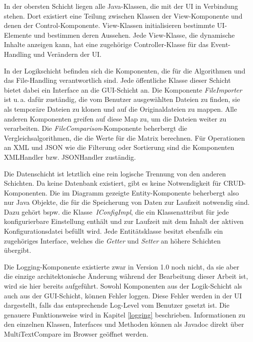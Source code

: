 In der obersten Schicht liegen alle Java-Klassen, die mit der UI in Verbindung stehen. Dort existiert eine Teilung zwischen Klassen der View-Komponente und denen der Control-Komponente. View-Klassen initialisieren bestimmte UI-Elemente und bestimmen deren Aussehen. Jede View-Klasse, die dynamische Inhalte anzeigen kann, hat eine zugehörige Controller-Klasse für das Event-Handling und Verändern der UI. 

In der Logikschicht befinden sich die Komponenten, die für die Algorithmen und das File-Handling verantwortlich sind. Jede öffentliche Klasse dieser Schicht bietet dabei ein Interface an die GUI-Schicht an. Die Komponente \textit{FileImporter} ist u.\,a. dafür zuständig, die vom Benutzer ausgewählten Dateien zu finden, sie als temporäre Dateien zu klonen und auf die Originaldateien zu mappen. Alle anderen Komponenten greifen auf diese Map zu, um die Dateien weiter zu verarbeiten. Die \emph{FileComparison}-Komponente beherbergt die Vergleichsalgorithmen, die die Werte für die Matrix berechnen. Für Operationen an XML und JSON wie die Filterung oder Sortierung sind die Komponenten XMLHandler bzw. JSONHandler zuständig.

Die Datenschicht ist letztlich eine rein logische Trennung von den anderen Schichten. Da keine Datenbank existiert, gibt es keine Notwendigkeit für CRUD-Komponenten. Die im Diagramm gezeigte Entity-Komponente beherbergt also nur Java Objekte, die für die Speicherung von Daten zur Laufzeit notwendig sind. Dazu gehört bspw. die Klasse \,\textit{IConfigImpl}, die ein Klassenattribut für jede konfigurierbare Einstellung enthält und zur Laufzeit mit dem Inhalt der aktiven Konfigurationsdatei befüllt wird. Jede Entitätsklasse besitzt ebenfalls ein zugehöriges Interface, welches die \emph{Getter} und \emph{Setter} an höhere Schichten übergibt.

Die Logging-Komponente existierte zwar in Version 1.0 noch nicht, da sie aber die einzige architektonische Änderung während der Bearbeitung dieser Arbeit ist, wird sie hier bereits aufgeführt. Sowohl Komponenten aus der Logik-Schicht als auch aus der GUI-Schicht, können Fehler loggen. Diese Fehler werden in der UI dargestellt, falls das entsprechende Log-Level vom Benutzer gesetzt ist. Die genauere Funktionsweise wird in Kapitel \ref{logging} beschrieben. Informationen zu den einzelnen Klassen, Interfaces und Methoden können als Javadoc direkt über MultiTextCompare im Browser geöffnet werden.


